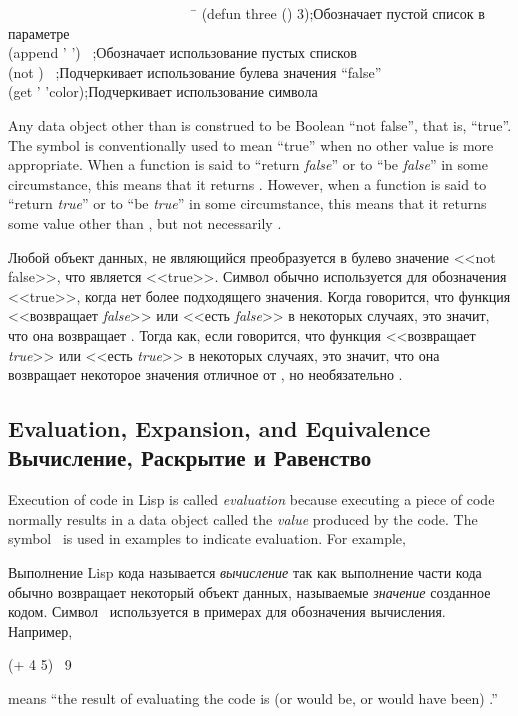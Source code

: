 \begin{lisp}
~~~~~~~~~~~~~~~~~~~~~~~~~~~\=\kill
(defun three () 3)\>;{\rm Обозначает пустой список в параметре} \\
(append '{\emptylist} '{\emptylist}) \EV\ {\emptylist}\>;{\rm Обозначает использование
пустых списков} \\
(not {\false}) \EV\ {\true}\>;{\rm Подчеркивает использование булева значения ``false''} \\
(get '{\nil} 'color)\>;{\rm Подчеркивает использование символа}
\end{lisp}

Any data object other than {\false} is construed to be Boolean
``not false'', that is, ``true''.  The symbol {\true} is conventionally
used to mean ``true'' when no other value is more appropriate.
When a function is said to ``return \textit{false}'' or to ``be \textit{false}''
in some circumstance, this means that it returns {\false}.
However, when a function is said to ``return \textit{true}'' or to ``be \textit{true}''
in some circumstance, this means that it returns some value other
than {\false}, but not necessarily {\true}.

Любой объект данных, не являющийся {\false} преобразуется в булево значение
<<not false>>, что является <<true>>. Символ {\true} обычно используется для
обозначения <<true>>, когда нет более подходящего значения.
Когда говорится, что функция <<возвращает \textit{false}>> или <<есть \textit{false}>>
в некоторых случаях, это значит, что она возвращает {\false}.
Тогда как, если говорится, что функция <<возвращает \textit{true}>> или <<есть {\it
true}>> в некоторых случаях, это значит, что она возвращает некоторое
значения отличное от {\false}, но необязательно {\true}.

\subsection{Evaluation, Expansion, and Equivalence Вычисление, Раскрытие и Равенство}

Execution of code in Lisp is called \textit{evaluation} because executing a
piece of code normally results in a data object called the \textit{value}
produced by the code.  The symbol \EV\ is used in examples to
indicate evaluation.
For example,

Выполнение Lisp кода называется \textit{вычисление} так как выполнение части кода
обычно возвращает некоторый объект данных, называемые \textit{значение} созданное
кодом. Символ \EV\ используется в примерах для обозначения вычисления.
Например,
\begin{lisp}
(+ 4 5) \EV\ 9
\end{lisp}
means ``the result of evaluating the code  is (or would be,
or would have been) .'' 

